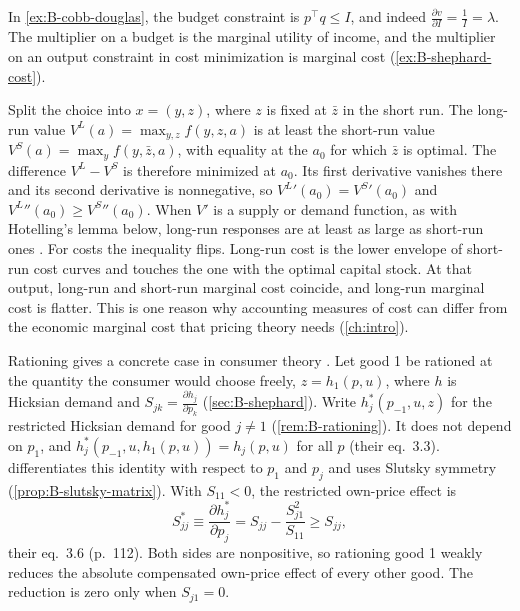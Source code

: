 In \cref{ex:B-cobb-douglas}, the budget constraint is $p^\top q \leq I$, and indeed $\frac{\partial v}{\partial I} = \frac{1}{I} = \lambda$.
The multiplier on a budget is the marginal utility of income, and the multiplier on an output constraint in cost
minimization is marginal cost (\cref{ex:B-shephard-cost}).

\begin{remark}\label{rem:B-lechatelier}
Split the choice into $x = (y, z)$, where $z$ is fixed at $\bar z$ in the short run. The long-run value
$V^L(a) = \max_{y, z}f(y, z, a)$ is at least the short-run value $V^S(a) = \max_yf(y, \bar z, a)$, with equality at the
$a_0$ for which $\bar z$ is optimal. The difference $V^L - V^S$ is therefore minimized at $a_0$. Its first derivative
vanishes there and its second derivative is nonnegative, so ${V^L}'(a_0) = {V^S}'(a_0)$ and
${V^L}''(a_0) \geq {V^S}''(a_0)$. When $V'$ is a supply or demand function, as with Hotelling's lemma below, long-run
responses are at least as large as short-run ones \citep{Samuelson1947}. For costs the inequality flips. Long-run cost
is the lower envelope of short-run cost curves and touches the one with the optimal capital stock. At that output,
long-run and short-run marginal cost coincide, and long-run marginal cost is flatter. This is one reason why
accounting measures of cost can differ from the economic marginal cost that pricing theory needs (\cref{ch:intro}).

Rationing gives a concrete case in consumer theory \citep[Section~4.3, pp.~110--112]{DeatonMuellbauer1980b}.
Let good 1 be rationed at the quantity the consumer would choose freely, $z = h_1(p, u)$, where $h$ is
Hicksian demand and $S_{jk} = \frac{\partial h_j}{\partial p_k}$ (\cref{sec:B-shephard}). Write
$h_j^*(p_{-1}, u, z)$ for the restricted Hicksian demand for good $j \neq 1$ (\cref{rem:B-rationing}). It does
not depend on $p_1$, and $h_j^*(p_{-1}, u, h_1(p, u)) = h_j(p, u)$ for all $p$ (their eq.~3.3).
 differentiates this identity with respect to $p_1$ and $p_j$ and uses Slutsky
symmetry (\cref{prop:B-slutsky-matrix}). With $S_{11} < 0$, the restricted own-price effect is
\begin{equation*}
S^*_{jj} \equiv \frac{\partial h_j^*}{\partial p_j} = S_{jj} - \frac{S_{j1}^2}{S_{11}} \geq S_{jj},
\end{equation*}
their eq.~3.6 (p.~112). Both sides are nonpositive, so rationing good 1 weakly reduces the absolute
compensated own-price effect of every other good. The reduction is zero only when $S_{j1} = 0$.
\end{remark}

